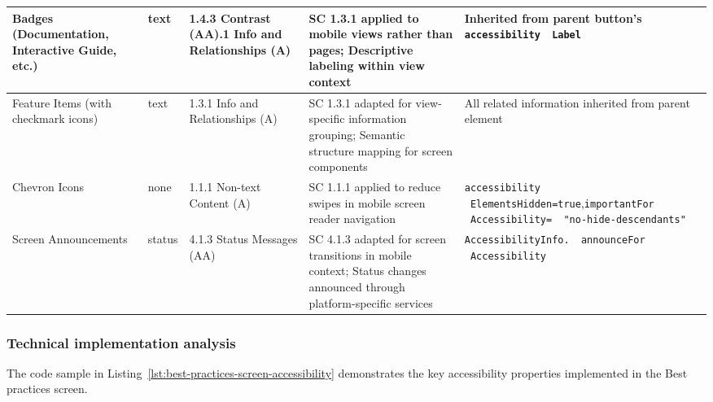 \begin{longtable}[c]{|C{2.5cm}|C{1.8cm}|C{2.8cm}|C{3.5cm}|C{4.7cm}|}
\hline
Badges (Documentation, Interactive Guide, etc.) & text & 1.4.3 Contrast (AA).1 Info and Relationships (A) & SC 1.3.1 applied to mobile views rather than pages; Descriptive labeling within view context & Inherited from parent button's \texttt{accessibility \ Label} \\
\hline
Feature Items (with checkmark icons) & text & 1.3.1 Info and Relationships (A) & SC 1.3.1 adapted for view-specific information grouping; Semantic structure mapping for screen components & All related information inherited from parent element\\
\hline
Chevron Icons & none & 1.1.1 Non-text Content (A) & SC 1.1.1 applied to reduce swipes in mobile screen reader navigation & \texttt{accessibility \ ElementsHidden=true},\newline \texttt{importantFor \ Accessibility= \ "no-hide-descendants"} \\
\hline
Screen Announcements & status & 4.1.3 Status Messages (AA) & SC 4.1.3 adapted for screen transitions in mobile context; Status changes announced through platform-specific services & \texttt{AccessibilityInfo. \ announceFor \ Accessibility} \\
\end{longtable}
\FloatBarrier

\subsubsection{Technical implementation analysis}

The code sample in Listing~\ref{lst:best-practices-screen-accessibility} demonstrates the key accessibility properties implemented in the Best practices screen.


